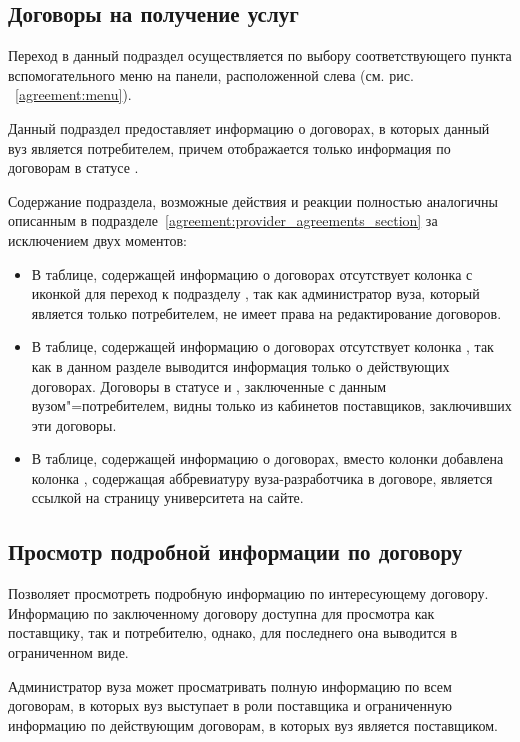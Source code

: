 \subsection{Договоры на получение услуг}
Переход в данный подраздел осуществляется по выбору соответствующего пункта вспомогательного меню на панели, расположенной слева (см. рис. ~\ref{agreement:menu}).

Данный подраздел предоставляет информацию о договорах, в которых данный вуз является потребителем, причем отображается только информация по договорам в статусе .

Содержание подраздела, возможные действия и реакции полностью аналогичны описанным в подразделе~\ref{agreement:provider_agreements_section} за исключением двух моментов:
\begin{itemize}
	\item В таблице, содержащей информацию о договорах отсутствует колонка с иконкой для переход к подразделу , так как администратор вуза, который является только потребителем, не имеет права на редактирование договоров.
	\item В таблице, содержащей информацию о договорах отсутствует колонка , так как в данном разделе выводится информация только о действующих договорах. Договоры в статусе  и , заключенные с данным вузом"=потребителем, видны только из кабинетов поставщиков, заключивших эти договоры.
	\item В таблице, содержащей информацию о договорах, вместо колонки  добавлена колонка , содержащая аббревиатуру вуза-разработчика в договоре, является ссылкой на страницу университета на сайте.
\end{itemize}


\subsection{Просмотр подробной информации по договору}
Позволяет просмотреть подробную  информацию по интересующему договору. Информацию по заключенному договору доступна для просмотра как поставщику, так и потребителю, однако, для последнего она выводится в ограниченном виде.

Администратор вуза может просматривать полную информацию по всем договорам, в которых вуз выступает в роли поставщика и ограниченную информацию по действующим договорам, в которых вуз является поставщиком.

